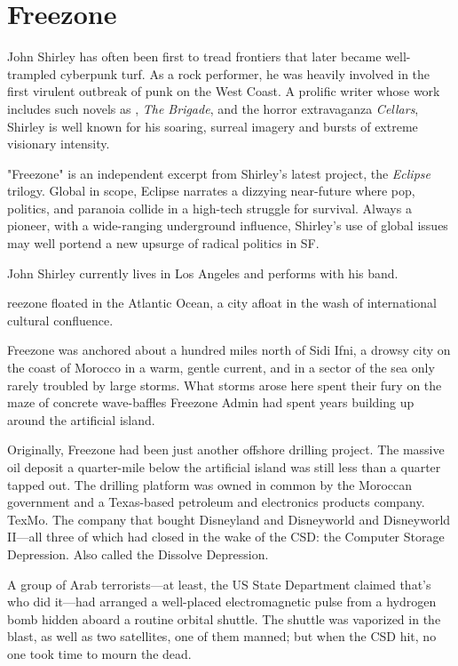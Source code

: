 \chapter{Freezone}

John Shirley has often been first to tread frontiers that later became well-trampled cyberpunk turf. As a rock performer, he was heavily involved in the first virulent outbreak of punk on the West Coast. A prolific writer whose work includes such novels as , \textit{The Brigade}, and the horror extravaganza \textit{Cellars}, Shirley is well known for his soaring, surreal imagery and bursts of extreme visionary intensity.

"Freezone" is an independent excerpt from Shirley's latest project, the \textit{Eclipse} trilogy. Global in scope, Eclipse narrates a dizzying near-future where pop, politics, and paranoia collide in a high-tech struggle for survival. Always a pioneer, with a wide-ranging underground influence, Shirley's use of global issues may well portend a new upsurge of radical politics in SF.

John Shirley currently lives in Los Angeles and performs with his band.

\hrulefill

reezone floated in the Atlantic Ocean, a city afloat in the wash of international cultural confluence.

Freezone was anchored about a hundred miles north of Sidi Ifni, a drowsy city on the coast of Morocco in a warm, gentle current, and in a sector of the sea only rarely troubled by large storms. What storms arose here spent their fury on the maze of concrete wave-baffles Freezone Admin had spent years building up around the artificial island.

Originally, Freezone had been just another offshore drilling project. The massive oil deposit a quarter-mile below the artificial island was still less than a quarter tapped out. The drilling platform was owned in common by the Moroccan government and a Texas-based petroleum and electronics products company. TexMo. The company that bought Disneyland and Disneyworld and Disneyworld II—all three of which had closed in the wake of the CSD: the Computer Storage Depression. Also called the Dissolve Depression.

A group of Arab terrorists—at least, the US State Department claimed that's who did it—had arranged a well-placed electromagnetic pulse from a hydrogen bomb hidden aboard a routine orbital shuttle. The shuttle was vaporized in the blast, as well as two satellites, one of them manned; but when the CSD hit, no one took time to mourn the dead.

